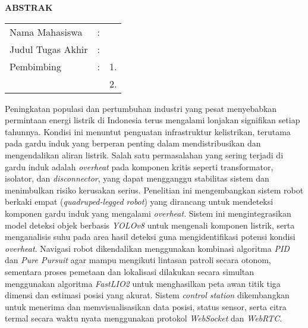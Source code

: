 \begin{center}
  \large\textbf{ABSTRAK}
\end{center}


\vspace{2ex}

\begingroup
\setlength{\tabcolsep}{0pt}
\noindent
\begin{tabularx}{\textwidth}{l >{\centering}m{2em} X}
  Nama Mahasiswa    & : & \name{}         \\
  Judul Tugas Akhir & : & \tatitle{}      \\
  Pembimbing        & : & 1. \advisor{}   \\
                    &   & 2. \coadvisor{} \\
\end{tabularx}
\endgroup

\vspace{2ex}
  Peningkatan populasi dan pertumbuhan industri yang pesat menyebabkan permintaan energi listrik di Indonesia terus mengalami lonjakan signifikan setiap tahunnya. Kondisi ini menuntut penguatan infrastruktur kelistrikan, terutama pada gardu induk yang berperan penting dalam mendistribusikan dan mengendalikan aliran listrik. Salah satu permasalahan yang sering terjadi di gardu induk adalah \emph{overheat} pada komponen kritis seperti transformator, isolator, dan \emph{disconnector}, yang dapat mengganggu stabilitas sistem dan menimbulkan risiko kerusakan serius.  Penelitian ini mengembangkan sistem robot berkaki empat (\emph{quadruped-legged robot}) yang dirancang untuk mendeteksi komponen gardu induk yang mengalami \emph{overheat}. Sistem ini mengintegrasikan model deteksi objek berbasis \emph{YOLOv8} untuk mengenali komponen listrik, serta menganalisis suhu pada area hasil deteksi guna mengidentifikasi potensi kondisi \emph{overheat}. Navigasi robot dikendalikan menggunakan kombinasi algoritma \emph{PID} dan \emph{Pure Pursuit} agar mampu mengikuti lintasan patroli secara otonom, sementara proses pemetaan dan lokalisasi dilakukan secara simultan menggunakan algoritma \emph{FastLIO2} untuk menghasilkan peta awan titik tiga dimensi dan estimasi posisi yang akurat. Sistem \emph{control station} dikembangkan untuk menerima dan memvisualisasikan data posisi, status sensor, serta citra termal secara waktu nyata menggunakan protokol \emph{WebSocket} dan \emph{WebRTC}.
  
